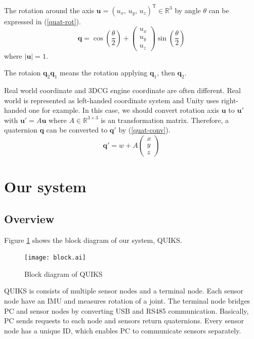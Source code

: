 \documentclass[journal]{IEEEtran}
\begin{document}
The rotation around the axis \(\bm{u} = (u_x,\,u_y,\,u_z)^\mathrm{T}\in\mathbb{R}^3\) by angle \(\theta\) can be expressed in (\ref{quat-rot}).
\begin{equation}
    \bm{q} = \cos\left(\frac{\theta}{2}\right) + \begin{pmatrix}
        u_x \\
        u_y \\
        u_z
    \end{pmatrix} \sin\left(\frac{\theta}{2}\right) \label{quat-rot}
\end{equation}
where \(|\bm{u}| = 1\).

The rotaion \(\bm{q}_2\bm{q}_1\) means the rotation applying \(\bm{q}_1\), then \(\bm{q}_2\).

Real world coordinate and 3DCG engine coordinate are often different.
Real world is represented as left-handed coordinate system and Unity uses right-handed one for example.
In this case, we should convert rotation axis \(\bm{u}\) to \(\bm{u}'\) with \(\bm{u}' = A\bm{u}\) where \(A\in\mathbb{R}^{3\times 3}\) is an transformation matrix.
Therefore, a quaternion \(\bm{q}\) can be converted to \(\bm{q}'\) by (\ref{quat-conv}).
\begin{equation}
    \bm{q}' = w + A\begin{pmatrix}
        x \\
        y \\
        z
    \end{pmatrix} \label{quat-conv}
\end{equation}

\section{Our system}
\subsection{Overview}
Figure \ref{block} shows the block diagram of our system, QUIKS.
\begin{figure}[tb]
    \centering
    \texttt{[image: block.ai]}
    \caption{Block diagram of QUIKS} \label{block}
\end{figure}
QUIKS is consists of multiple sensor nodes and a terminal node.
Each sensor node have an IMU and measures rotation of a joint.
The terminal node bridges PC and sensor nodes by converting USB and RS485 communication.
Basically, PC sends requests to each node and sensors return quaternions.
Every sensor node has a unique ID, which enables PC to communicate sensors separately.
\end{document}
